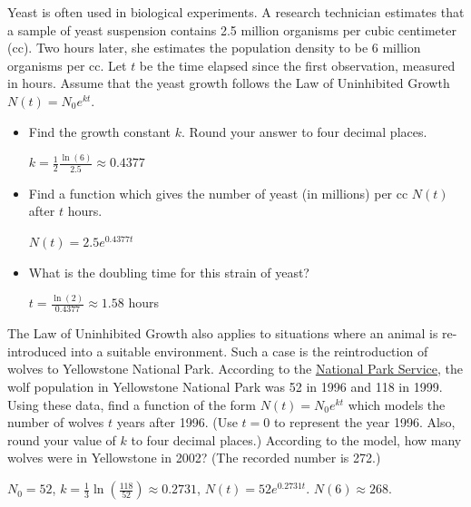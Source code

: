 \documentclass{ximera}
\begin{document}
\begin{problem}    
Yeast is often used in biological experiments.  A research technician estimates that a sample of yeast suspension contains 2.5 million organisms per cubic centimeter (cc).  Two hours later, she estimates the population density to be 6 million organisms per cc.  Let $t$ be the time elapsed since the first observation, measured in hours.  Assume that the yeast growth follows the Law of Uninhibited Growth $N(t) = N_{0} e^{kt}$.

\begin{itemize}
    \item 
    Find the growth constant $k$. Round your answer to four decimal places.

\begin{solution}
    $k = \frac{1}{2}\frac{\ln(6)}{2.5} \approx 0.4377$
\end{solution}
    
\item
    Find a function which gives the number of yeast (in millions) per cc $N(t)$ after $t$ hours.

\begin{solution}
    $N(t) = 2.5e^{0.4377 t}$
\end{solution}
    
\item 
    What is the doubling time for this strain of yeast?

\begin{solution}
    $t = \frac{\ln(2)}{0.4377} \approx 1.58$ hours
\end{solution}
    
\end{itemize}

\end{problem}


\begin{problem}
    
The Law of Uninhibited Growth also applies to situations where an animal is re-introduced into a suitable environment.  Such a case is the reintroduction of wolves to Yellowstone National Park.   According to the \href{http://www.nps.gov/yell/naturescience/wolves.htm}{\underline{National Park Service}}, the wolf population in Yellowstone National Park was 52 in 1996 and 118 in 1999.  Using these data, find a function of the form $N(t) = N_{0} e^{kt}$  which models the number of wolves $t$ years after 1996.  (Use $t = 0$ to represent the year 1996.  Also, round your value of $k$ to four decimal places.)  According to the model, how many wolves were in Yellowstone in 2002?  (The recorded number is 272.)

\begin{solution}
     $N_{0} = 52$,  $k = \frac{1}{3} \ln\left( \frac{118}{52}\right) \approx 0.2731$, $N(t) = 52e^{0.2731t}$.  $N(6) \approx 268$. 
\end{solution}

\end{problem}
\end{document}
